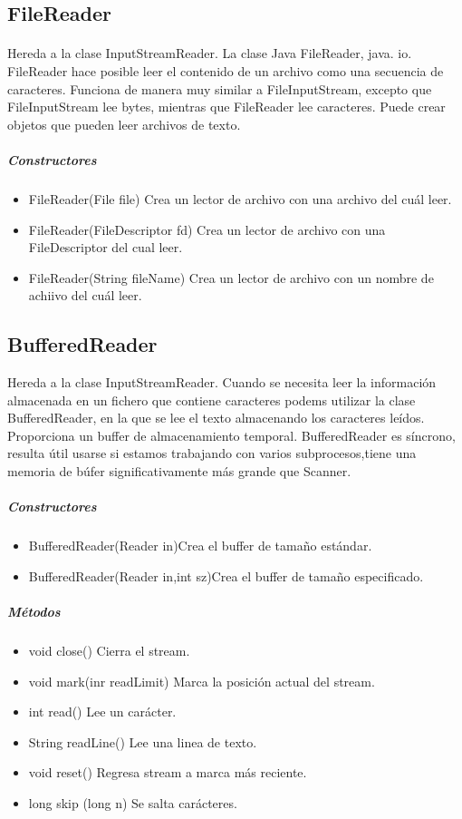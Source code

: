 \documentclass[11pt]{article}
\begin{document}
\subsection{FileReader}
\paragraph{}
Hereda a la clase InputStreamReader. La clase Java FileReader, java. io. FileReader hace posible leer el contenido de un archivo como una secuencia de caracteres. Funciona de manera muy similar a FileInputStream, excepto que FileInputStream lee bytes, mientras que FileReader lee caracteres. 
Puede crear objetos que pueden leer archivos de texto. 

\subparagraph{Constructores}
\begin{itemize}
\item FileReader(File file)
\quad Crea un lector de archivo con una archivo del cuál leer.
\item FileReader(FileDescriptor fd)
\quad Crea un lector de archivo con una FileDescriptor del cual leer.
\item FileReader(String fileName)
\quad Crea un lector de archivo con un nombre de achiivo del cuál leer.
\end{itemize}

\subsection{BufferedReader}
Hereda a la clase InputStreamReader. Cuando se necesita leer la información almacenada en un fichero que contiene caracteres podems utilizar la clase BufferedReader, en la que se lee el texto almacenando los caracteres leídos. Proporciona un buffer de almacenamiento temporal.
BufferedReader es síncrono, resulta útil usarse si estamos trabajando con varios subprocesos,tiene una memoria de búfer significativamente más grande que Scanner.

\subparagraph{Constructores}
\begin{itemize}
\item BufferedReader(Reader in)\quad Crea el buffer de tamaño estándar.
\item BufferedReader(Reader in,int sz)\quad Crea el buffer de tamaño especificado.
\end{itemize}
\subparagraph{Métodos}
\begin{itemize}
\item void close() \quad Cierra el stream.
\item void mark(inr readLimit) \quad Marca la posición actual del stream.
\item int read() \quad Lee un carácter.
\item String readLine() \quad Lee una linea de texto.
\item void reset() \quad Regresa stream a marca más reciente. 
\item long skip (long n) \quad Se salta carácteres. 
\end{itemize}
\end{document}
